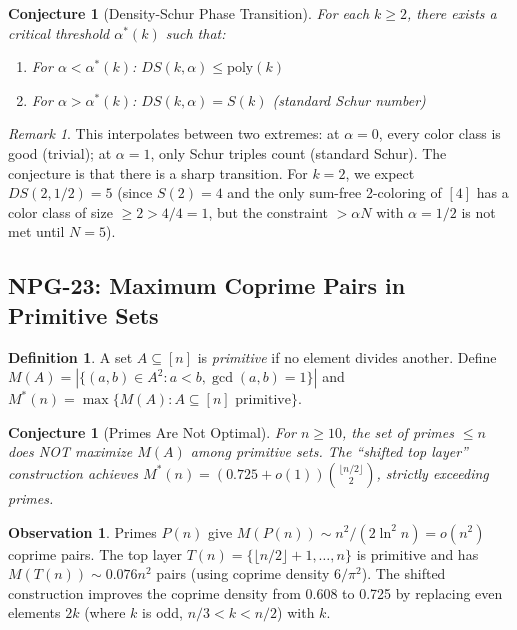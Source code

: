 \documentclass[11pt,a4paper]{article}
\newtheorem{conjecture}[theorem]{Conjecture}
\theoremstyle{definition}
\newtheorem{definition}[theorem]{Definition}
\newtheorem{observation}[theorem]{Observation}
\theoremstyle{remark}
\newtheorem{remark}[theorem]{Remark}
\begin{document}
\begin{conjecture}[Density-Schur Phase Transition]
For each $k \geq 2$, there exists a critical threshold $\alpha^*(k)$ such that:
\begin{enumerate}[nosep]
\item For $\alpha < \alpha^*(k)$: $DS(k,\alpha) \leq \mathrm{poly}(k)$
\item For $\alpha > \alpha^*(k)$: $DS(k,\alpha) = S(k)$ (standard Schur number)
\end{enumerate}
\end{conjecture}

\begin{remark}
This interpolates between two extremes: at $\alpha = 0$, every color class is
good (trivial); at $\alpha = 1$, only Schur triples count (standard Schur).
The conjecture is that there is a sharp transition. For $k=2$, we expect
$DS(2, 1/2) = 5$ (since $S(2)=4$ and the only sum-free 2-coloring of $[4]$
has a color class of size $\geq 2 > 4/4 = 1$, but the constraint $> \alpha N$
with $\alpha = 1/2$ is not met until $N=5$).
\end{remark}

\subsection{NPG-23: Maximum Coprime Pairs in Primitive Sets}

\begin{definition}
A set $A \subseteq [n]$ is \emph{primitive} if no element divides another.
Define $M(A) = |\{(a,b) \in A^2 : a < b, \gcd(a,b) = 1\}|$
and $M^*(n) = \max\{M(A) : A \subseteq [n] \text{ primitive}\}$.
\end{definition}

\begin{conjecture}[Primes Are Not Optimal]
For $n \geq 10$, the set of primes $\leq n$ does NOT maximize $M(A)$
among primitive sets. The ``shifted top layer'' construction achieves
$M^*(n) = (0.725 + o(1))\binom{\lfloor n/2 \rfloor}{2}$, strictly
exceeding primes.
\end{conjecture}

\begin{observation}
Primes $P(n)$ give $M(P(n)) \sim n^2/(2\ln^2 n) = o(n^2)$ coprime pairs.
The top layer $T(n) = \{\lfloor n/2 \rfloor + 1, \ldots, n\}$ is primitive
and has $M(T(n)) \sim 0.076 n^2$ pairs (using coprime density $6/\pi^2$).
The shifted construction improves the coprime density from 0.608 to 0.725 by
replacing even elements $2k$ (where $k$ is odd, $n/3 < k < n/2$) with $k$.
\end{observation}
\end{document}
